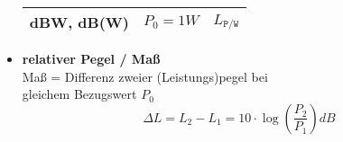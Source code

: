 \begin{itemize}
\begin{tabularx}{0.8\columnwidth}{l|X|X}
			dBW, dB(W) & $ P_0 = 1W $ & $ L_{\texttt{P/W}}$ \\
			\hline
			\end{tabularx}
			
        \item \textbf{relativer Pegel / Maß}\\
        Maß = Differenz zweier (Leistungs)pegel bei\\ gleichem Bezugswert $ P_0 $
        \begin{equation*}
        	\Delta L = L_2 - L_1 = 10 \cdot \log \left( \frac{P_2}{P_1}\right)  \si{dB}
        \end{equation*}
        \end{itemize}


